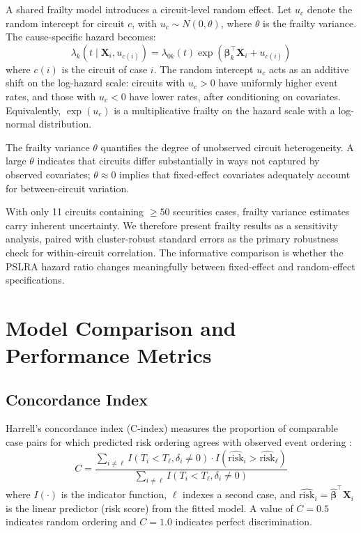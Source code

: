 A shared frailty model introduces a circuit-level random
effect. Let $u_c$ denote the random intercept for circuit $c$,
with $u_c \sim N(0, \theta)$, where $\theta$ is the frailty
variance. The cause-specific hazard becomes:
\begin{equation}
\lambda_k(t \mid \mathbf{X}_i, u_{c(i)}) = \lambda_{0k}(t) \exp(\boldsymbol{\beta}_k^\top \mathbf{X}_i + u_{c(i)})
\end{equation}
where $c(i)$ is the circuit of case $i$. The random intercept
$u_c$ acts as an additive shift on the log-hazard scale:
circuits with $u_c > 0$ have uniformly higher event rates, and
those with $u_c < 0$ have lower rates, after conditioning on
covariates. Equivalently, $\exp(u_c)$ is a multiplicative
frailty on the hazard scale with a log-normal distribution.

The frailty variance $\theta$ quantifies the degree of
unobserved circuit heterogeneity. A large $\theta$ indicates
that circuits differ substantially in ways not captured by
observed covariates; $\theta \approx 0$ implies that
fixed-effect covariates adequately account for between-circuit
variation.

With only 11 circuits containing $\geq 50$ securities cases,
frailty variance estimates carry inherent uncertainty.
We therefore present frailty results as a sensitivity analysis,
paired with cluster-robust standard errors as the primary
robustness check for within-circuit correlation. The informative
comparison is whether the PSLRA hazard ratio changes
meaningfully between fixed-effect and random-effect
specifications.

\section{Model Comparison and Performance Metrics}

\subsection{Concordance Index}

Harrell's concordance index (C-index) measures the proportion
of comparable case pairs for which predicted risk ordering
agrees with observed event ordering \citep{harrell1982}:
\begin{equation}
C = \frac{\sum_{i \neq \ell} I(T_i < T_\ell, \delta_i \neq 0) \cdot I(\widehat{\text{risk}}_i > \widehat{\text{risk}}_\ell)}{\sum_{i \neq \ell} I(T_i < T_\ell, \delta_i \neq 0)}
\end{equation}
where $I(\cdot)$ is the indicator function, $\ell$ indexes a second case, and $\widehat{\text{risk}}_i = \hat{\boldsymbol{\beta}}^\top \mathbf{X}_i$ is the linear predictor (risk score) from the fitted model. A value of $C = 0.5$ indicates random ordering and $C = 1.0$ indicates perfect discrimination.

